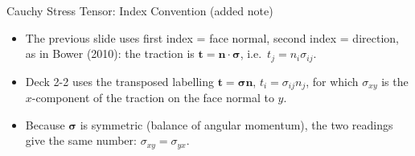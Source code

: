 \documentclass{beamer}
\begin{document}
\begin{frame}{Cauchy Stress Tensor: Index Convention (added note)}
    \begin{itemize}
        \item The previous slide uses first index = face normal, second index = direction, as in Bower (2010): the traction is $\mathbf{t} = \mathbf{n}\cdot\boldsymbol{\sigma}$, i.e.\ $t_j = n_i\sigma_{ij}$.
        \item Deck 2-2 uses the transposed labelling $\mathbf{t}=\boldsymbol{\sigma}\mathbf{n}$, $t_i = \sigma_{ij}n_j$, for which $\sigma_{xy}$ is the $x$-component of the traction on the face normal to $y$.
        \item Because $\boldsymbol{\sigma}$ is symmetric (balance of angular momentum), the two readings give the same number: $\sigma_{xy}=\sigma_{yx}$.
    \end{itemize}
\end{frame}
\end{document}
